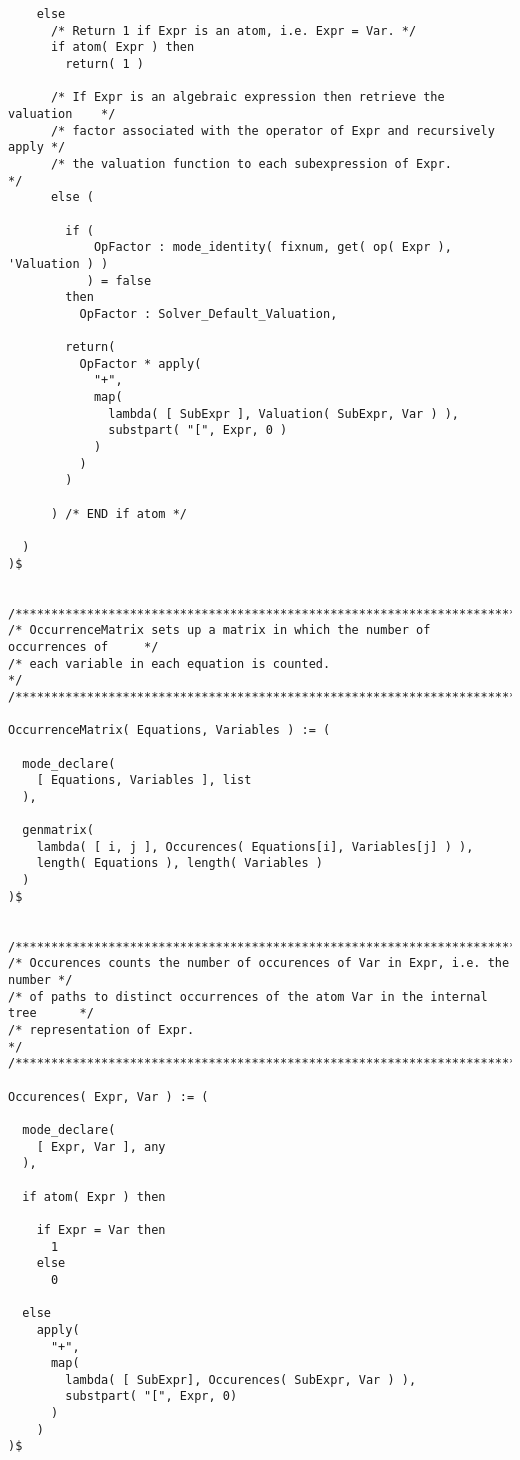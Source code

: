 \begin{verbatim}
    else
      /* Return 1 if Expr is an atom, i.e. Expr = Var. */
      if atom( Expr ) then
        return( 1 )

      /* If Expr is an algebraic expression then retrieve the valuation    */
      /* factor associated with the operator of Expr and recursively apply */
      /* the valuation function to each subexpression of Expr.             */
      else (

        if (
            OpFactor : mode_identity( fixnum, get( op( Expr ), 'Valuation ) )
           ) = false
        then
          OpFactor : Solver_Default_Valuation,

        return(
          OpFactor * apply(
            "+",
            map(
              lambda( [ SubExpr ], Valuation( SubExpr, Var ) ),
              substpart( "[", Expr, 0 )
            )
          )
        )

      ) /* END if atom */

  )
)$


/******************************************************************************/
/* OccurrenceMatrix sets up a matrix in which the number of occurrences of     */
/* each variable in each equation is counted.                                 */
/******************************************************************************/

OccurrenceMatrix( Equations, Variables ) := (

  mode_declare(
    [ Equations, Variables ], list
  ),

  genmatrix(
    lambda( [ i, j ], Occurences( Equations[i], Variables[j] ) ),
    length( Equations ), length( Variables )
  )
)$


/******************************************************************************/
/* Occurences counts the number of occurences of Var in Expr, i.e. the number */
/* of paths to distinct occurrences of the atom Var in the internal tree      */
/* representation of Expr.                                                    */
/******************************************************************************/

Occurences( Expr, Var ) := (

  mode_declare(
    [ Expr, Var ], any
  ),

  if atom( Expr ) then

    if Expr = Var then
      1
    else
      0

  else
    apply(
      "+",
      map(
        lambda( [ SubExpr], Occurences( SubExpr, Var ) ),
        substpart( "[", Expr, 0)
      )
    )
)$



\end{verbatim}
